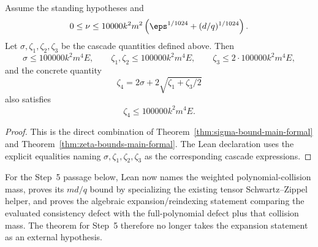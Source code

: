 \begin{theorem}\label{thm:error-cascade-main-formal}
	\leanok
	Assume the standing hypotheses and
	\[
		0 \le \nu \le 10000k^2m^2\left(\eps^{1/1024} + (d/q)^{1/1024}\right).
	\]
	Let $\sigma,\zeta_1,\zeta_2,\zeta_3$ be the cascade quantities defined above. Then
	\[
		\sigma \le 100000k^2m^4 E,
		\qquad
		\zeta_1,\zeta_2 \le 100000k^2m^4 E,
		\qquad
		\zeta_3 \le 2 \cdot 100000k^2m^4 E,
	\]
	and the concrete quantity
	\[
		\zeta_4 = 2\sigma + 2\sqrt{\zeta_1 + \zeta_3/2}
	\]
	also satisfies
	\[
		\zeta_4 \le 100000k^2m^4 E.
	\]
\end{theorem}
\begin{proof}
	\leanok
	This is the direct combination of Theorem~\ref{thm:sigma-bound-main-formal} and Theorem~\ref{thm:zeta-bounds-main-formal}. The Lean declaration uses the explicit equalities naming $\sigma,\zeta_1,\zeta_2,\zeta_3$ as the corresponding cascade expressions.
\end{proof}

\begin{remark}\label{rem:main-formal-step5-sz-bound}
	For the Step~5 passage below, Lean now names the weighted polynomial-collision
	mass, proves its $md/q$ bound by specializing the existing tensor
	Schwartz--Zippel helper, and proves the algebraic expansion/reindexing
	statement comparing the evaluated consistency defect with the full-polynomial
	defect plus that collision mass. The theorem for Step~5 therefore no longer
	takes the expansion statement as an external hypothesis.
\end{remark}

